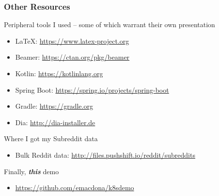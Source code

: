     \begin{frame}
        \frametitle{Other Resources}
        Peripheral tools I used -- some of which warrant their own presentation
        \begin{itemize}
            \item \LaTeX: \href{https://www.latex-project.org}{https://www.latex-project.org}
            \item Beamer: \href{https://ctan.org/pkg/beamer}{https://ctan.org/pkg/beamer}
            \item Kotlin: \href{https://kotlinlang.org}{https://kotlinlang.org}
            \item Spring Boot: \href{https://spring.io/projects/spring-boot}{https://spring.io/projects/spring-boot}
            \item Gradle: \href{https://gradle.org}{https://gradle.org}
            \item Dia: \href{http://dia-installer.de}{http://dia-installer.de}
        \end{itemize}
        \smallskip
        Where I got my Subreddit data
        \begin{itemize}
            \item Bulk Reddit data: \href{http://files.pushshift.io/reddit/subreddits}{http://files.pushshift.io/reddit/subreddits}
        \end{itemize}
        Finally, \textbf{\textit{this}} demo
        \begin{itemize}
            \item \href{https://github.com/emacdona/k8sdemo}{https://github.com/emacdona/k8sdemo}
        \end{itemize}
    \end{frame}

